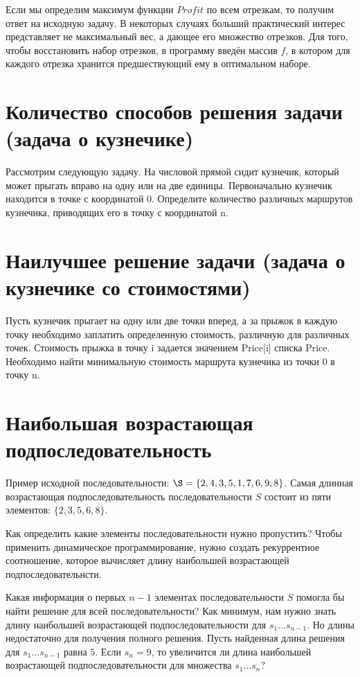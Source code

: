 \documentclass[14pt,openany]{book}
\begin{document}
Если мы определим максимум функции $Profit$ по всем отрезкам, то получим ответ на исходную задачу.
В некоторых случаях больший практический интерес представляет не максимальный вес, а дающее его
множество отрезков. Для того, чтобы восстановить набор отрезков, в программу введён массив $f$,
в котором для каждого отрезка хранится предшествующий ему в оптимальном наборе.

\section{Количество способов решения задачи (задача о кузнечике)}

Рассмотрим следующую задачу. На числовой прямой сидит кузнечик, который может прыгать вправо на одну или на две единицы. Первоначально кузнечик находится в точке с координатой 0. Определите количество различных маршрутов кузнечика, приводящих его в точку с координатой n.

\section{Наилучшее решение задачи (задача о кузнечике со стоимостями)}

Пусть кузнечик прыгает на одну или две точки вперед, а за прыжок в каждую точку необходимо заплатить определенную стоимость, различную для различных точек. Стоимость прыжка в точку i задается значением Price[i] списка Price. Необходимо найти минимальную стоимость маршрута кузнечика из точки 0 в точку n.

\section{Наибольшая возрастающая подпоследовательность}

Пример исходной последовательности: $\S=\{2,4,3,5,1,7,6,9,8\}$. Самая длинная возрастающая
подпоследовательность последовательности $S$ состоит из пяти элементов: $\{2,3,5,6,8\}$.

Как определить какие элементы последовательности нужно пропустить? Чтобы применить динамическое
программирование, нужно создать рекуррентное соотношение, которое вычисляет длину
наибольшей возрастающей подпоследовательнсти.

Какая информация о первых $n-1$ элементах последовательности $S$ помогла бы найти решение для
всей последовательности? Как минимум, нам нужно знать длину наибольшей возрастающей 
подпоследовательности для $s_1 \ldots s_{n-1}$. Но длины недостаточно для получения полного
решения. Пусть найденная длина решения для $s_1 \ldots s_{n-1}$ равна $5$. Если $s_n = 9$,
то увеличится ли длина наибольшей возрастающей подпоследовательности для множества
$s_1 \ldots s_n$?
\end{document}
